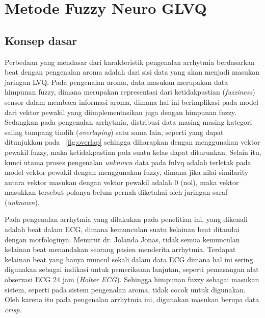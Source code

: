 \section{Metode Fuzzy Neuro GLVQ}

\subsection{Konsep dasar}
Perbedaan yang mendasar dari karakteristik pengenalan arrhytmia berdasarkan beat
dengan pengenalan aroma adalah dari sisi data yang akan menjadi masukan
jaringan LVQ. Pada pengenalan aroma, data masukan merupakan data himpunan
fuzzy, dimana merupakan representasi dari ketidakpastian (\emph{fuzziness})
sensor dalam membaca informasi aroma, dimana hal ini berimplikasi pada model
dari vektor pewakil yang diimplementasikan juga dengan himpunan fuzzy. Sedangkan
pada pengenalan arrhytmia, distribusi data masing-masing kategori saling tumpang
tindih (\emph{overlaping}) satu sama lain, seperti yang dapat ditunjukkan pada
\pic~\ref{fig:overlap} sehingga diharapkan dengan menggunakan vektor pewakil
fuzzy, maka ketidakpastian pola suatu kelas dapat diturunkan. Selain itu, kunci
utama proses pengenalan \emph{unknown} data pada \gls{fnlvq} adalah terletak
pada model vektor pewakil dengan menggunakan fuzzy, dimana jika nilai
similarity antara vektor masukan dengan vektor pewakil adalah 0 (nol), maka
vektor masukkan tersebut polanya belum pernah diketahui oleh jaringan saraf
(\emph{unknown}).


Pada pengenalan arrhytmia yang dilakukan pada penelitian ini, yang dikenali
adalah beat dalam ECG, dimana kemunculan suatu kelainan beat ditandai dengan
morfologinya. Menurut dr. Jolanda Jonas, tidak semua kemunculan kelainan beat
menandakan seorang pasien menderita arrhytmia. Terdapat kelainan beat yang hanya muncul
sekali dalam data ECG dimana hal ini sering digunakan sebagai indikasi untuk
pemeriksaan lanjutan, seperti pemasangan alat observasi ECG 24 jam
(\emph{Holter ECG}). Sehingga himpunan fuzzy sebagai masukan
sistem, seperti pada sistem pengenalan aroma, tidak cocok untuk digunakan. Oleh
karena itu pada pengenalan arrhytmia ini, digunakan masukan berupa data
\emph{crisp}.
 
